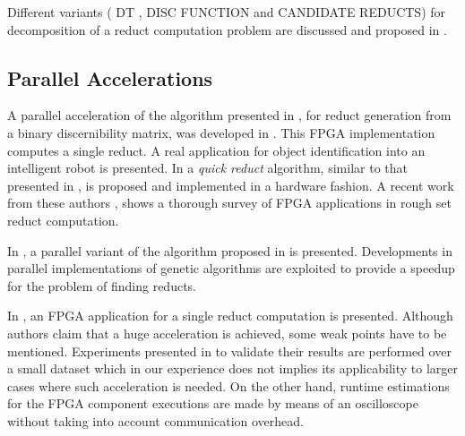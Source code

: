 \documentclass[authoryear,11pt]{elsarticle}
\makeatletter
\newcommand{\setword}[2]{%
  \phantomsection
  #1\def\@currentlabel{\unexpanded{#1}}\label{#2}%
}
\makeatother
\begin{document}
  Different variants (\setword{DT}{DT}, DISC FUNCTION and CANDIDATE REDUCTS) for decomposition of a reduct 
  computation problem are discussed and proposed in \citep{Strakowski08}.

\subsection{Parallel Accelerations}

  A parallel acceleration of the algorithm presented in \citep{Yang08}, for reduct generation from a binary
  discernibility matrix, was developed in \citep{Tiwari11,Tiwari12}. This FPGA implementation computes a 
  single reduct. A real application for object identification into an intelligent robot is presented.
  In \citep{Tiwari13} a \emph{quick reduct} algorithm, similar to that presented in \citep{Chouchoulas01}, 
  is proposed and implemented in a hardware fashion. A recent work from these authors \citep{Tiwari14}, 
  shows a thorough survey of FPGA applications in rough set reduct computation.
	
  In \citep{Wroblewski98}, a parallel variant of the algorithm proposed in \citep{Wroblewski95} is presented.
  Developments in parallel implementations of genetic algorithms are exploited to provide a speedup for the 
  problem of finding reducts.
  
  In \citep{Grzes13,Kopczynski14}, an FPGA application for a single reduct computation is presented. Although
  authors claim that a huge acceleration is achieved, some weak points have to be mentioned. Experiments presented 
  in \citep{Kopczynski14} to validate their results are performed over a small dataset which in our experience 
  does not implies its applicability to larger cases where such acceleration is needed. On the other hand, 
  runtime estimations for the FPGA component executions are made by means of an oscilloscope without taking into 
  account communication overhead.
  
\end{document}
